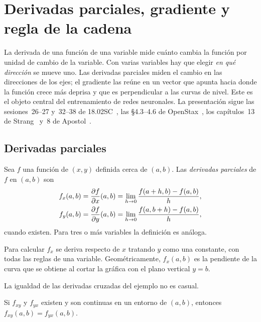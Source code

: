 \chapter{Derivadas parciales, gradiente y regla de la cadena}
\label{tema:4}

La derivada de una función de una variable mide cuánto cambia la función por unidad de cambio de la variable. Con varias variables hay que elegir \emph{en qué dirección} se mueve uno. Las derivadas parciales miden el cambio en las direcciones de los ejes; el gradiente las reúne en un vector que apunta hacia donde la función crece más deprisa y que es perpendicular a las curvas de nivel. Este es el objeto central del entrenamiento de redes neuronales. La presentación sigue las sesiones~26--27 y~32--38 de 18.02SC~\cite{mit1802}, las §4.3--4.6 de OpenStax~\cite{openstax3}, los capítulos~13 de Strang~\cite{strangcalc} y~8 de Apostol~\cite{apostol2}.

\section{Derivadas parciales}

\begin{definicion}\label{def:parcial}
Sea $f$ una función de $(x,y)$ definida cerca de $(a,b)$. Las \emph{derivadas parciales} de $f$ en $(a,b)$ son
\begin{align*}
f_x(a,b)&=\frac{\partial f}{\partial x}(a,b)=\lim_{h\to0}\frac{f(a+h,b)-f(a,b)}{h},\\
f_y(a,b)&=\frac{\partial f}{\partial y}(a,b)=\lim_{h\to0}\frac{f(a,b+h)-f(a,b)}{h},
\end{align*}
cuando existen. Para tres o más variables la definición es análoga.
\end{definicion}

Para calcular $f_x$ se deriva respecto de $x$ tratando $y$ como una constante, con todas las reglas de una variable. Geométricamente, $f_x(a,b)$ es la pendiente de la curva que se obtiene al cortar la gráfica con el plano vertical $y=b$.

\addtocounter{definicion}{1}%

La igualdad de las derivadas cruzadas del ejemplo no es casual.

\begin{teorema}[Schwarz]\label{teo:schwarz}
Si $f_{xy}$ y $f_{yx}$ existen y son continuas en un entorno de $(a,b)$, entonces $f_{xy}(a,b)=f_{yx}(a,b)$.
\end{teorema}


